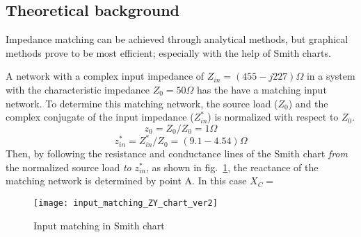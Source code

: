 \documentclass[report.tex]{subfiles}
\begin{document}
\subsection{Theoretical background}

Impedance matching can be achieved through analytical methods, but graphical methods prove to be most efficient; especially  with the help of Smith charts.

A network with a complex input impedance of $Z_{in}=(455-j227)\Omega$ in a system with the characteristic impedance $Z_0=50 \Omega$ has the have a matching input network. To determine this matching network, the source load ($Z_0$) and the complex conjugate of the input impedance ($Z_{in}^*$) is normalized with respect to $Z_0$.
\begin{equation*}
z_0=Z_0/Z_0 = 1\Omega
\end{equation*}
\begin{equation*}
z_{in}^*=Z_{in}^*/Z_0=(9.1-4.54)\Omega
\end{equation*}
Then, by following the resistance and conductance lines of the Smith chart \emph{from} the normalized source load \emph{to} $z_{in}^*$, as shown in fig.~\ref{fig:input_matching_smith_chart}, the reactance of the matching network is determined by point A. In this case $X_C=$

\begin{figure}[h]
\texttt{[image: input\_matching\_ZY\_chart\_ver2]}
\caption{Input matching in Smith chart}
\label{fig:input_matching_smith_chart}
\end{figure}
\end{document}
